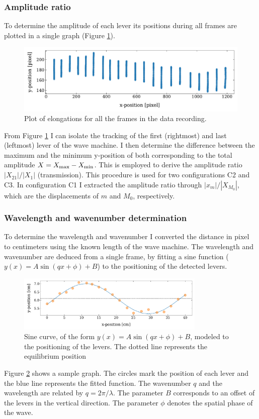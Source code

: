 \documentclass[12pt]{article}
\begin{document}
\subsubsection{Amplitude ratio}
To determine the amplitude of each lever its positions during all frames are plotted in a single graph (Figure \ref{fig:elongations}).
\begin{figure}[hbt]
  \includegraphics[width=.8\columnwidth]{analysis/amplitude}
  \caption{Plot of elongations for all the frames in the data recording.}\label{fig:elongations}
\end{figure}
From Figure \ref{fig:elongations} I can isolate the tracking of the first (rightmost) and last (leftmost) lever of the wave machine. I then determine the difference between the maximum and the minimum y-position of both corresponding to the total amplitude $X=X_{\rm max}-X_{\rm min}$. This is employed to derive the amplitude ratio $|X_{21}|/|X_1|$ (transmission). This procedure is used for two configurations C2 and C3. In configuration C1 I extracted the amplitude ratio through $|x_{m}|/|X_{M_{0}}|$, which are the displacements of $m$ and $M_0$, respectively.

\subsubsection{Wavelength and wavenumber determination}
To determine the wavelength and wavenumber I converted the distance in pixel to centimeters using the known length of the wave machine. The wavelength and wavenumber are deduced from a single frame, by fitting a sine function ($y(x) = A\sin(qx + \phi) + B$) to the positioning of the detected levers. 
\begin{figure}[hbt]
  \includegraphics[width=0.8\textwidth]{analysis/wavelength_determination}
  \caption{Sine curve, of the form $y(x) = A\sin(qx + \phi) + B$, modeled to the positioning of the levers. The dotted line represents the equilibrium position}\label{fig:wavelength}
\end{figure}
Figure \ref{fig:wavelength} shows a sample graph. The circles mark the position of each lever and the blue line represents the fitted function. The wavenumber $q$ and the wavelength are related by $q = 2\pi/\lambda$. The parameter $B$ corresponds to an offset of the levers in the vertical direction. The parameter $\phi$  denotes the spatial phase of the wave. 
\end{document}
